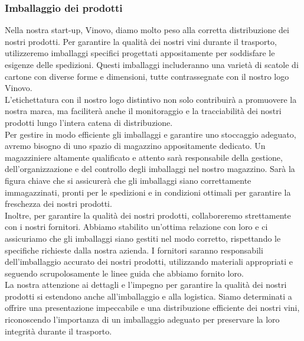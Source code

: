 \documentclass[12pt, a4paper]{article}
\newcommand{\meskip}{\medskip \\}
\begin{document}
\subsubsection{Imballaggio dei prodotti}
Nella nostra start-up, Vinovo, diamo molto peso alla corretta distribuzione dei nostri prodotti. Per garantire la qualità dei nostri vini durante il trasporto, utilizzeremo imballaggi specifici progettati appositamente per soddisfare le esigenze delle spedizioni. Questi imballaggi includeranno una varietà di scatole di cartone con diverse forme e dimensioni, tutte contrassegnate con il nostro logo Vinovo.\meskip
L'etichettatura con il nostro logo distintivo non solo contribuirà a promuovere la nostra marca, ma faciliterà anche il monitoraggio e la tracciabilità dei nostri prodotti lungo l'intera catena di distribuzione. \meskip
Per gestire in modo efficiente gli imballaggi e garantire uno stoccaggio adeguato, avremo bisogno di uno spazio di magazzino appositamente dedicato. Un magazziniere altamente qualificato e attento sarà responsabile della gestione, dell'organizzazione e del controllo degli imballaggi nel nostro magazzino. Sarà la figura chiave che si assicurerà che gli imballaggi siano correttamente immagazzinati, pronti per le spedizioni e in condizioni ottimali per garantire la freschezza dei nostri prodotti.\meskip
Inoltre, per garantire la qualità dei nostri prodotti, collaboreremo strettamente con i nostri fornitori. Abbiamo stabilito un'ottima relazione con loro e ci assicuriamo che gli imballaggi siano gestiti nel modo corretto, rispettando le specifiche richieste dalla nostra azienda. I fornitori saranno responsabili dell'imballaggio accurato dei nostri prodotti, utilizzando materiali appropriati e seguendo scrupolosamente le linee guida che abbiamo fornito loro.\meskip
La nostra attenzione ai dettagli e l'impegno per garantire la qualità dei nostri prodotti si estendono anche all'imballaggio e alla logistica. Siamo determinati a offrire una presentazione impeccabile e una distribuzione efficiente dei nostri vini, riconoscendo l'importanza di un imballaggio adeguato per preservare la loro integrità durante il trasporto.
\end{document}

